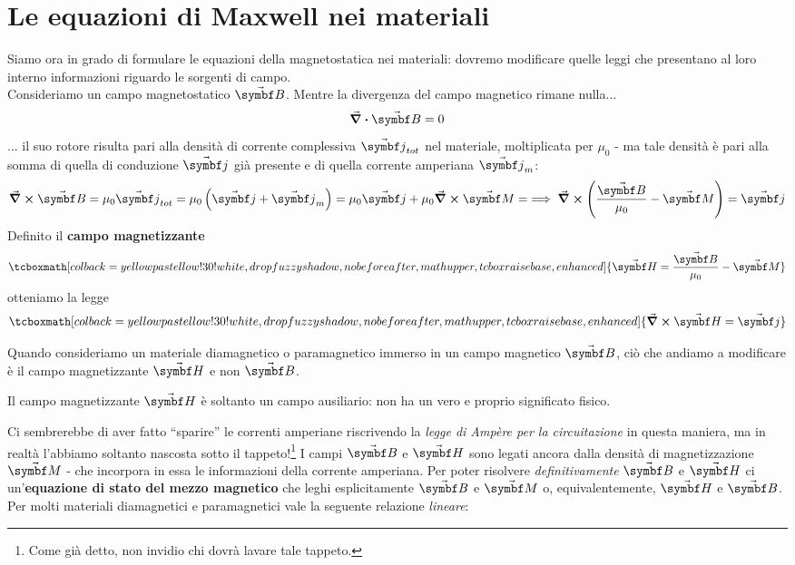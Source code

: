 \section{Le equazioni di Maxwell nei materiali}
Siamo ora in grado di formulare le equazioni della magnetostatica nei materiali: dovremo modificare quelle leggi che presentano al loro interno informazioni riguardo le sorgenti di campo.\\
Consideriamo un campo magnetostatico $\vba{B}$. Mentre la divergenza del campo magnetico rimane nulla...
\begin{equation}
	\div{\vba{B}}=0
\end{equation}
... il suo rotore risulta pari alla densità di corrente complessiva $\vba{j}_{tot}$ nel materiale, moltiplicata per $\mu_0$ - ma tale densità è pari alla somma di quella di conduzione $\vba{j}$ già presente e di quella corrente amperiana $\vba{j}_m$:
\begin{equation*}
	\curl{\vba{B}}=\mu_0\vba{j}_{tot}=\mu_0\left(\vba{j}+\vba{j}_m\right)=\mu_0\vba{j}+\mu_0\curl{\vba{M}}=\implies \curl{\left(\frac{\vba{B}}{\mu_0}-\vba{M}\right)}=\vba{j}
\end{equation*}
Definito il \textbf{campo magnetizzante}
\begin{equation}
		\tcboxmath[colback=yellowpastellow!30!white,drop fuzzy shadow, nobeforeafter, math upper, tcbox raise base, enhanced]{\vba{H}=\frac{\vba{B}}{\mu_0}-\vba{M}}
\end{equation}
otteniamo la legge
\begin{equation}
		\tcboxmath[colback=yellowpastellow!30!white,drop fuzzy shadow, nobeforeafter, math upper, tcbox raise base, enhanced]{\curl{\vba{H}}=\vba{j}}\label{QuartaMaxwellMagnetUno}
\end{equation}
\begin{observe}
	Quando consideriamo un materiale diamagnetico o paramagnetico immerso in un campo magnetico $\vba{B}$, ciò che andiamo a modificare è il campo magnetizzante $\vba{H}$ e non $\vba{B}$.
\end{observe}
\begin{attention}
	Il campo magnetizzante $\vba{H}$ è soltanto un campo ausiliario: non ha un vero e proprio significato fisico.
\end{attention}
Ci sembrerebbe di aver fatto ``sparire'' le correnti amperiane riscrivendo la \textit{legge di Ampère per la circuitazione} in questa maniera, ma in realtà l'abbiamo soltanto nascosta sotto il tappeto!\footnote{Come già detto, non invidio chi dovrà lavare tale tappeto.}  I campi $\vba{B}$ e $\vba{H}$ sono legati ancora dalla densità di magnetizzazione $\vba{M}$ - che incorpora in essa le informazioni della corrente amperiana. Per poter risolvere \textit{definitivamente} $\vba{B}$ e $\vba{H}$ ci un'\textbf{equazione di stato del mezzo magnetico} che leghi esplicitamente $\vba{B}$ e $\vba{M}$ o, equivalentemente, $\vba{H}$ e $\vba{B}$. Per molti materiali diamagnetici e paramagnetici vale la seguente relazione \textit{lineare}:
